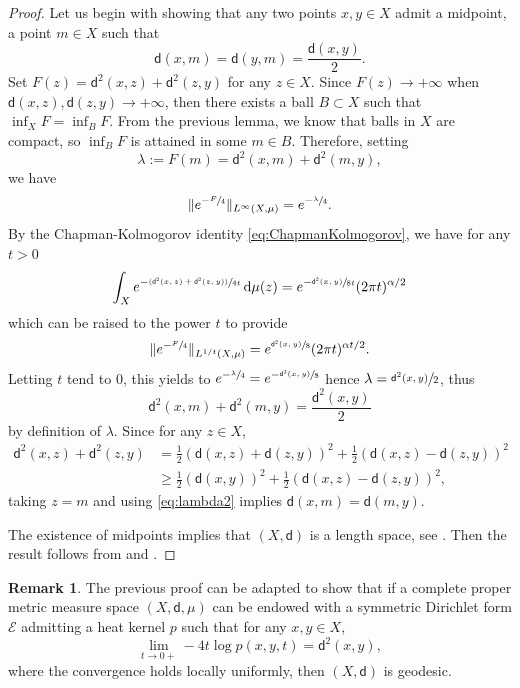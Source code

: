 \documentclass[10pt]{amsart}
\newcommand{\psfrac}[2]{\sfrac{(#1)}{#2}}
\theoremstyle{plain}
\theoremstyle{definition}
\newtheorem{remark}[theorem]{Remark}
\newcommand{\cE}{\mathcal{E}}
\newcommand{\di}{\mathop{}\!\mathrm{d}}
\newcommand{\dist}{\mathsf{d}}
\begin{document}
\begin{proof}
Let us begin with showing that any two points $x,y \in X$ admit a midpoint, \ie a point $m \in X$ such that
\begin{equation}\label{eq:middle}
\dist(x,m)=\dist(y,m)=\frac{\dist(x,y)}{2}.
\end{equation}
Set $F(z)=\dist^2(x,z)+\dist^2(z,y)$ for any $z \in X$. Since $F(z) \to +\infty$ when $\dist(x,z), \dist(z,y) \to +\infty$, then there exists a ball $B \subset X$ such that $\inf_X F = \inf_B F$. From the previous lemma, we know that balls in $X$ are compact, so $\inf_B F$ is attained in some $m \in B$. Therefore, setting
\[
\lambda:=F(m)=\dist^2(x,m)+\dist^2(m,y),
\]
we have
\[
\|e^{-\sfrac{F}{4}}\|_{L^\infty(X,\mu)} = e^{-\sfrac{\lambda}{4}}.
\]
By the Chapman-Kolmogorov identity \eqref{eq:ChapmanKolmogorov}, we have for any $t>0$
\[
\int_X e^{-\psfrac{\dist^2(x,z)+\dist^2(z,y)}{4t}}\di \mu(z) = e^{-\sfrac{\dist^2(x,y)}{8t}}(2\pi t)^{\alpha/2}
\]
which can be raised to the power $t$ to provide
\[
\|e^{-\sfrac{F}{4}}\|_{L^{1/t}(X,\mu)} = e^{\sfrac{\dist^2(x,y)}{8}}(2\pi t)^{\alpha t/2}.
\]
Letting $t$ tend to $0$, this yields to $e^{-\sfrac{\lambda}{4}}=e^{-\sfrac{\dist^2(x,y)}{8}}$ hence $\lambda=\sfrac{\dist^2(x,y)}{2}$, thus \begin{equation}\label{eq:lambda2} \dist^2(x,m)+\dist^2(m,y) = \frac{\dist^2(x,y)}{2}
\end{equation}
by definition of $\lambda$. Since for any $z \in X$,
\begin{align*}
\dist^2(x,z)+\dist^2(z,y) & = \frac{1}{2}(\dist(x,z)+\dist(z,y))^2 + \frac{1}{2}(\dist(x,z)-\dist(z,y))^2\\
&\ge \frac{1}{2}(\dist(x,y))^2 + \frac{1}{2}(\dist(x,z)-\dist(z,y))^2,
\end{align*}
taking $z=m$ and using \eqref{eq:lambda2} implies $\dist(x,m)=\dist(m,y)$.

The existence of midpoints implies that $(X,\dist)$ is a length space, see \cite[Th.\,2.4.16\,(1)]{BuragoBuragoIvanov}. Then the result follows from \cite[Th.\,2.5.23]{BuragoBuragoIvanov} and \cite[Th.\,2.5.9]{BuragoBuragoIvanov}.
\end{proof}
\begin{remark}\label{rem:geodesicplus}
The previous proof can be adapted to show that if a complete proper metric measure space $(X,\dist,\mu)$ can be endowed with a symmetric Dirichlet form $\cE$ admitting a heat kernel $p$ such that for any $x,y\in X$,
\[
\lim_{t\to 0+}-4t\log p(x,y,t)=\dist^2(x,y),
\]
where the convergence holds locally uniformly, then $(X,\dist)$ is geodesic.
\end{remark}
\end{document}
